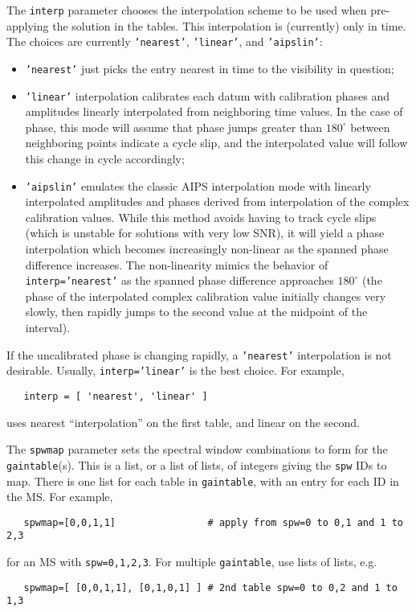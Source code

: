 The {\tt interp} parameter chooses the interpolation scheme to be used
when pre-applying the solution in the tables.  This interpolation is
(currently) only in time.
The choices are currently {\tt 'nearest'}, {\tt 'linear'}, and {\tt 'aipslin'}:
\begin{itemize}
\item {\tt 'nearest'} just picks the entry nearest in time to the
   visibility in question;

\item {\tt 'linear'} interpolation calibrates each datum with
   calibration phases and amplitudes linearly 
   interpolated from neighboring time values. In the case of phase,
   this mode will assume that phase jumps greater than $180^\circ$
   between neighboring points indicate a cycle slip, and the interpolated
   value will follow this change in cycle accordingly;

\item {\tt 'aipslin'} emulates the classic AIPS interpolation mode with
   linearly interpolated amplitudes and phases derived from
   interpolation of the complex calibration values. While this method
   avoids having to track cycle slips (which is unstable for solutions
   with very low SNR), it will yield a phase interpolation which becomes
   increasingly non-linear as the spanned phase difference increases. The
   non-linearity mimics the behavior of {\tt interp='nearest'} as the spanned
   phase difference approaches $180^\circ$ (the phase of the interpolated
   complex calibration value initially changes very slowly, then rapidly
   jumps to the second value at the midpoint of the interval).
\end{itemize}
If the uncalibrated phase is changing rapidly, a {\tt 'nearest'}
interpolation is not desirable. Usually, {\tt interp='linear'} is the
best choice. For example,
\small
\begin{verbatim}
   interp = [ 'nearest', 'linear' ]
\end{verbatim}
\normalsize
uses nearest ``interpolation'' on the first table, and linear
on the second.

The {\tt spwmap} parameter sets the spectral window combinations to
form for the {\tt gaintable}(s).  This is a list, or a list of lists,
of integers giving the {\tt spw} IDs to map.  There is one list for
each table in {\tt gaintable}, with an entry for each ID in the MS.
For example,
\small
\begin{verbatim}
   spwmap=[0,0,1,1]                # apply from spw=0 to 0,1 and 1 to 2,3
\end{verbatim}
\normalsize
for an MS with {\tt spw=0,1,2,3}.  For multiple {\tt gaintable}, use
lists of lists, e.g.
\small
\begin{verbatim}
   spwmap=[ [0,0,1,1], [0,1,0,1] ] # 2nd table spw=0 to 0,2 and 1 to 1,3
\end{verbatim} 
\normalsize

